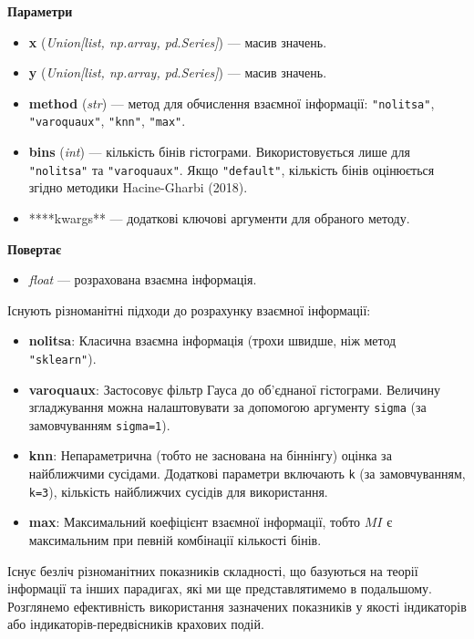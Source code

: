 \documentclass[
  letterpaper,
]{report}
\providecommand{\tightlist}{%
  \setlength{\itemsep}{0pt}\setlength{\parskip}{0pt}}\usepackage{longtable,booktabs,array}
\begin{document}
\textbf{Параметри}

\begin{itemize}
\tightlist
\item
  \textbf{x} (\emph{Union{[}list, np.array, pd.Series{]}}) --- масив
  значень.
\item
  \textbf{y} (\emph{Union{[}list, np.array, pd.Series{]}}) --- масив
  значень.
\item
  \textbf{method} (\emph{str}) --- метод для обчислення взаємної
  інформації: \texttt{"nolitsa"}, \texttt{"varoquaux"}, \texttt{"knn"},
  \texttt{"max"}.
\item
  \textbf{bins} (\emph{int}) --- кількість бінів гістограми.
  Використовується лише для \texttt{"nolitsa"} та \texttt{"varoquaux"}.
  Якщо \texttt{"default"}, кількість бінів оцінюється згідно методики
  Hacine-Gharbi (2018).
\item
  ****kwargs** --- додаткові ключові аргументи для обраного методу.
\end{itemize}

\textbf{Повертає}

\begin{itemize}
\tightlist
\item
  \emph{float} --- розрахована взаємна інформація.
\end{itemize}

Існують різноманітні підходи до розрахунку взаємної інформації:

\begin{itemize}
\tightlist
\item
  \textbf{nolitsa}: Класична взаємна інформація (трохи швидше, ніж метод
  \texttt{"sklearn"}).
\item
  \textbf{varoquaux}: Застосовує фільтр Гауса до об'єднаної гістограми.
  Величину згладжування можна налаштовувати за допомогою аргументу
  \texttt{sigma} (за замовчуванням \texttt{sigma=1}).
\item
  \textbf{knn}: Непараметрична (тобто не заснована на біннінгу) оцінка
  за найближчими сусідами. Додаткові параметри включають \texttt{k} (за
  замовчуванням, \texttt{k=3}), кількість найближчих сусідів для
  використання.
\item
  \textbf{max}: Максимальний коефіцієнт взаємної інформації, тобто
  \(MI\) є максимальним при певній комбінації кількості бінів.
\end{itemize}

Існує безліч різноманітних показників складності, що базуються на теорії
інформації та інших парадигах, які ми ще представлятимемо в подальшому.
Розглянемо ефективність використання зазначених показників у якості
індикаторів або індикаторів-передвісників крахових подій.
\end{document}
